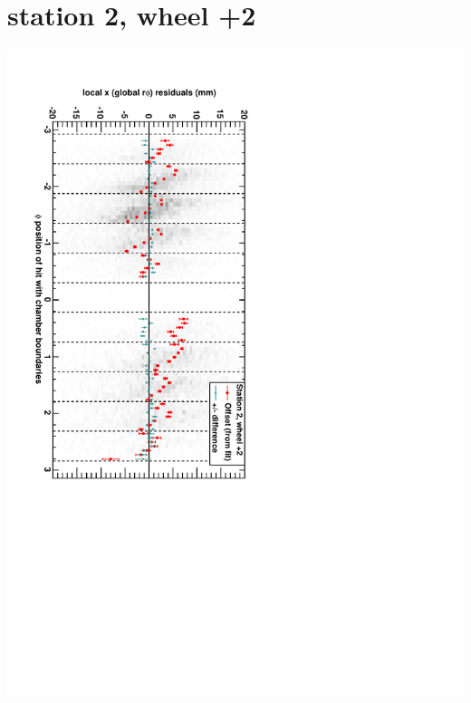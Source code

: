\documentclass[compress]{beamer}
\begin{document}
\section*{station 2, wheel +2}
\begin{frame} \vfill \mbox{\hspace{-1 cm}\includegraphics[height=1.2\linewidth, angle=90]{DTrphiVsPhi_st2_whE.pdf}} \end{frame}
\end{document}
